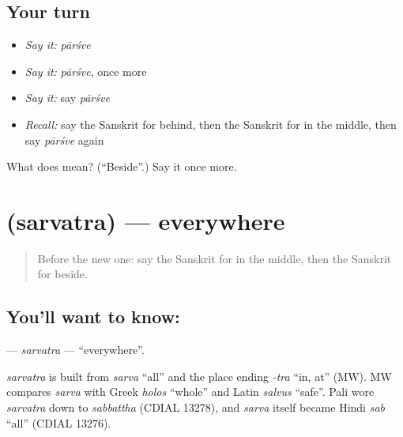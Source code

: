 \subsection*{Your turn}
\begin{itemize}
\raggedright
  \item \emph{Say it:} \emph{pārśve}
  \item \emph{Say it:} \emph{pārśve}, once more
  \item \emph{Say it:} say \emph{pārśve}
  \item \emph{Recall:} say the Sanskrit for behind, then the Sanskrit for in the middle, then say \emph{pārśve} again
\end{itemize}

\begin{tcolorbox}[breakable,colback=teal!4,colframe=teal!35!black,title={Before you move on}]
What does  mean? (\textquotedblleft{}Beside\textquotedblright{}.) Say it once more.
\end{tcolorbox}
\section[\texorpdfstring{\sk{सर्वत्र} (sarvatra)}{सर्वत्र (sarvatra)}]{ (sarvatra) — everywhere}

\label{lesson:SA-C95-sarvatra}



\begin{quote}
Before the new one: say the Sanskrit for in the middle, then the Sanskrit for beside.
\end{quote}

\subsection*{You'll want to know: }
\textbf{} — \emph{sarvatra} — \textquotedblleft{}everywhere\textquotedblright{}.

\begin{cousinweb}
\emph{sarvatra} is built from \emph{sarva} \textquotedblleft{}all\textquotedblright{} and the place ending \emph{-tra} \textquotedblleft{}in, at\textquotedblright{} (MW). MW compares \emph{sarva} with Greek \emph{holos} \textquotedblleft{}whole\textquotedblright{} and Latin \emph{salvus} \textquotedblleft{}safe\textquotedblright{}. Pali wore \emph{sarvatra} down to \emph{sabbattha} (CDIAL 13278), and \emph{sarva} itself became Hindi \emph{sab} \textquotedblleft{}all\textquotedblright{} (CDIAL 13276).
\end{cousinweb}

